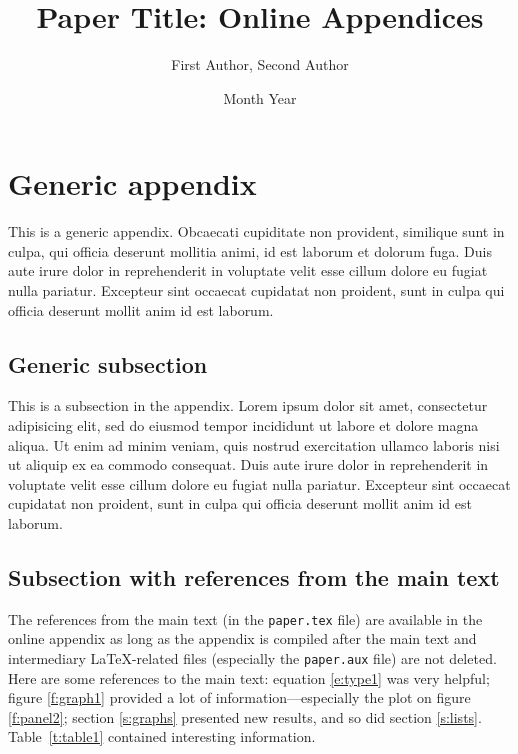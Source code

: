 \documentclass[letterpaper,11pt,leqno]{article}
\begin{document}
\title{Paper Title: Online Appendices}

\author{First Author, Second Author}

\date{Month Year}


\begin{titlepage}
\maketitle
\tableofcontents
\end{titlepage}

\section{Generic appendix}\label{a:appendix1}

This is a generic appendix. Obcaecati cupiditate non provident, similique sunt in culpa, qui officia deserunt mollitia animi, id est laborum et dolorum fuga. Duis aute irure dolor in reprehenderit in voluptate velit esse cillum dolore eu fugiat nulla pariatur. Excepteur sint occaecat cupidatat non proident, sunt in culpa qui officia deserunt mollit anim id est laborum. 

\subsection{Generic subsection} 

This is a subsection in the appendix. Lorem ipsum dolor sit amet, consectetur adipisicing elit, sed do eiusmod tempor incididunt ut labore et dolore magna aliqua. Ut enim ad minim veniam, quis nostrud exercitation ullamco laboris nisi ut aliquip ex ea commodo
consequat. Duis aute irure dolor in reprehenderit in voluptate velit esse
cillum dolore eu fugiat nulla pariatur. Excepteur sint occaecat cupidatat non
proident, sunt in culpa qui officia deserunt mollit anim id est laborum. 

\subsection{Subsection with references from the main text} 

The references from the main text (in the \texttt{paper.tex} file) are available in the online appendix as long as the appendix is compiled after the main text and intermediary LaTeX-related files (especially the \texttt{paper.aux} file) are not deleted. Here are some references to the main text: equation \ref{e:type1} was very helpful; figure \ref{f:graph1} provided a lot of information---especially the plot on figure \ref{f:panel2}; section \ref{s:graphs} presented new results, and so did section \ref{s:lists}. Table~\ref{t:table1} contained interesting information.
\end{document}
